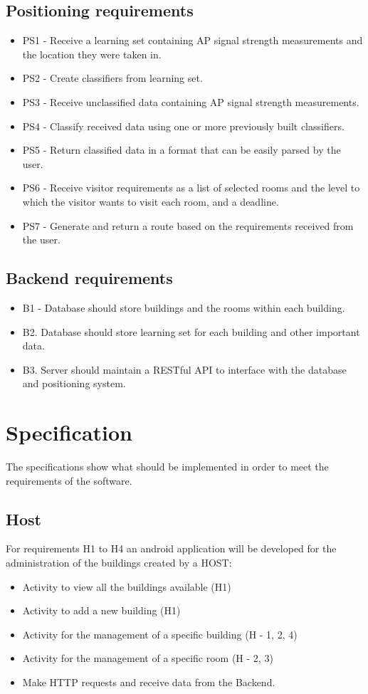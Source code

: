 \subsection{Positioning requirements}
	\begin{itemize}
		\item PS1 - Receive a learning set containing AP signal strength measurements and the 	location they were taken in.
		\item PS2 - Create classifiers from learning set.
		\item PS3 - Receive unclassified data containing AP signal strength measurements.
		\item PS4 - Classify received data using one or more previously built classifiers.
		\item PS5 - Return classified data in a format that can be easily parsed by the user.
		\item PS6 - Receive visitor requirements as a list of selected rooms and the level to which the visitor wants to visit each room, and a deadline.
		\item PS7 - Generate and return a route based on the requirements received from the user.
	\end{itemize}

\subsection{Backend requirements}
	\begin{itemize}
		\item B1 - Database should store buildings and the rooms within each building. 
		\item B2. Database should store learning set for each building and other important data.
		\item B3. Server should maintain a RESTful API to interface with the database and positioning 			system.
	\end{itemize}


\section{Specification}
The specifications show what should be implemented in order to meet the requirements of the software.

\subsection{Host}
For requirements H1 to H4 an android application will be developed for the administration of the buildings created by a HOST:
	\begin{itemize}
		\item Activity to view all the buildings available (H1)
		\item Activity to add a new building (H1)
		\item Activity for the management of a specific building (H - 1, 2, 4)
		\item Activity for the management of a specific room (H - 2, 3)
		\item Make HTTP requests and receive data from the Backend.
	\end{itemize}

